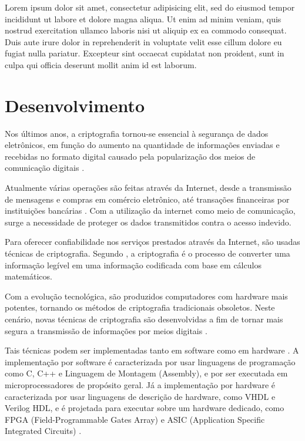 \documentclass[
	12pt,				%
	twoside,			%
	a4paper,			%
	chapter=TITLE,		%
	english,			%
	brazil				%
	]{tcc}
\begin{document}
	Lorem ipsum dolor sit amet, consectetur adipisicing elit, sed do eiusmod
	tempor incididunt ut labore et dolore magna aliqua. Ut enim ad minim veniam,
	quis nostrud exercitation ullamco laboris nisi ut aliquip ex ea commodo
	consequat. Duis aute irure dolor in reprehenderit in voluptate velit esse
	cillum dolore eu fugiat nulla pariatur. Excepteur sint occaecat cupidatat non
	proident, sunt in culpa qui officia deserunt mollit anim id est laborum.

	\chapter[Desenvolvimento]{Desenvolvimento}

Nos últimos anos, a criptografia tornou-se essencial à segurança de dados eletrônicos, em função do aumento na quantidade de informações enviadas e recebidas no formato digital causado pela popularização dos meios de comunicação digitais \cite{deshpande2009fpga, almeidaconstruccao}.

Atualmente várias operações são feitas através da Internet, desde a transmissão de mensagens e compras em comércio eletrônico, até transações financeiras por instituições bancárias \cite{grandesDesafios2013}. Com a utilização da internet como meio de comunicação, surge a necessidade de proteger os dados transmitidos contra o acesso indevido.

Para oferecer confiabilidade nos serviços prestados através da Internet, são usadas técnicas de criptografia. Segundo , a criptografia é o processo de converter uma informação legível em uma informação codificada com base em cálculos matemáticos.

Com a evolução tecnológica, são produzidos computadores com hardware mais potentes, tornando os métodos de criptografia tradicionais obsoletos. Neste cenário, novas técnicas de criptografia são desenvolvidas a fim de tornar mais segura a transmissão de informações por meios digitais \cite{modeloAESsimplificado}. 

Tais técnicas podem ser implementadas tanto em software como em hardware \cite{almeidaconstruccao}. A implementação por software é caracterizada por usar linguagens de programação como C, C++ e Linguagem de Montagem (Assembly), e por ser executada em microprocessadores de propósito geral. Já a implementação por hardware é caracterizada por usar linguagens de descrição de hardware, como VHDL e Verilog HDL, e é projetada para executar sobre um hardware dedicado, como FPGA (Field-Programmable Gates Array) e  ASIC (Application Specific Integrated Circuits) \cite{gaj2009fpga}.
\end{document}
